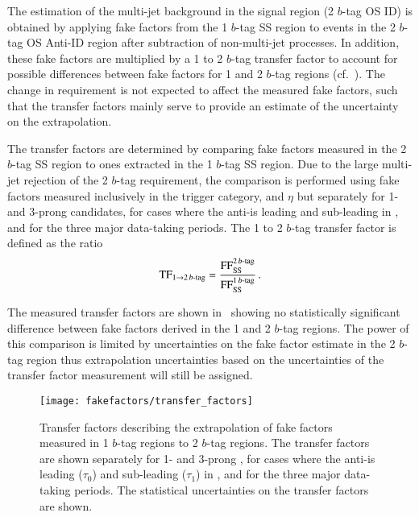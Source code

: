 The estimation of the multi-jet background in the \hadhad signal
region (2 $b$-tag OS ID) is obtained by applying fake factors from the
1 $b$-tag SS region to events in the 2 $b$-tag OS Anti-ID region after
subtraction of non-multi-jet processes. In addition, these fake
factors are multiplied by a 1 to 2 $b$-tag transfer factor to account
for possible differences between fake factors for 1 and 2 $b$-tag
regions (cf.\ ). The change in \btag
requirement is not expected to affect the measured fake factors, such
that the transfer factors mainly serve to provide an estimate of the
uncertainty on the extrapolation.

The transfer factors are determined by comparing fake factors measured
in the 2 $b$-tag SS region to ones extracted in the 1 $b$-tag SS
region. Due to the large multi-jet rejection of the 2 $b$-tag
requirement, the comparison is performed using fake factors measured
inclusively in the trigger category, \tauhadvis \pT and \tauhadvis
$\eta$ but separately for 1- and 3-prong \tauhadvis candidates, for
cases where the anti-\tauhadvis is leading and sub-leading in \pT, and
for the three major data-taking periods. The 1 to 2 $b$-tag transfer
factor is defined as the ratio
\begin{align*}
  \text{TF}_{1 \rightarrow 2\,b\text{-tag}} = \frac{\text{FF}_{\text{SS}}^{2\,b\text{-tag}}}{\text{FF}_{\text{SS}}^{1\,b\text{-tag}}} \,\text{.}
\end{align*}

The measured transfer factors are shown
in~ showing no statistically
significant difference between fake factors derived in the 1 and 2
$b$-tag regions. The power of this comparison is limited by
uncertainties on the fake factor estimate in the 2 $b$-tag region thus
extrapolation uncertainties based on the uncertainties of the transfer
factor measurement will still be assigned.

\begin{figure}[htbp]
  \centering

  \texttt{[image: fakefactors/transfer\_factors]}

  \caption{Transfer factors describing the extrapolation of fake
    factors measured in 1 $b$-tag regions to 2 $b$-tag regions. The
    transfer factors are shown separately for 1- and 3-prong
    \tauhadvis, for cases where the anti-\tauhadvis is leading
    ($\tau_0$) and sub-leading ($\tau_1$) in \pT, and for the three
    major data-taking periods.  The statistical uncertainties on the
    transfer factors are shown.}%
  \label{fig:mjfakes_transfer_factor}
\end{figure}

